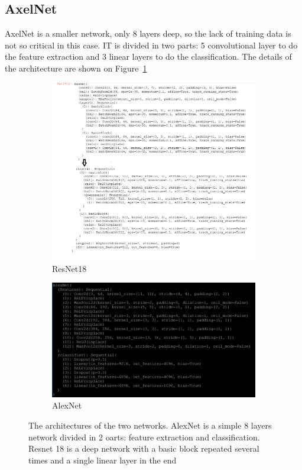 \subsection{AxelNet}
AxelNet is a smaller network, only 8 layers deep, so the lack of training data is not so critical in this case. IT is divided in two parts: 5 convolutional layer to do the feature extraction and 3 linear layers to do the classification.  The details of the architecture are shown on Figure~\ref{fig:resarchi}
\begin{figure}
\begin{subfigure}{.5\textwidth}
  \centering
  \includegraphics[width=.8\linewidth]{./figures/03-Resnet_architecture}
  \caption{ResNet18}
  \label{fig:resarchi}
\end{subfigure}%
\begin{subfigure}{.5\textwidth}
  \centering
  \includegraphics[width=.8\linewidth]{./figures/03-alexnet_architecture}
  \caption{AlexNet}
  \label{fig:alexarchi}
\end{subfigure}
\caption{The architectures of the two networks. AlexNet is a simple 8 layers network divided in 2 oarts: feature extraction and classification. Resnet 18 is a deep network with a basic block repeated several times and a single linear layer in the end}
\end{figure}

